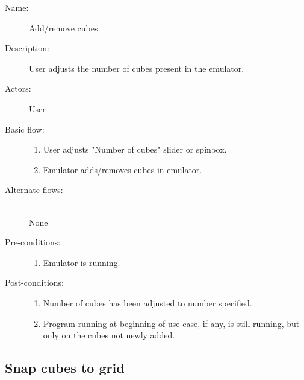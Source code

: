\documentclass[12pt]{article}
\begin{document}
    \begin{description}
      \item[Name:] Add/remove cubes
      \item[Description:] User adjusts the number of cubes present in the emulator.
      \item[Actors:] User
      \item[Basic flow:] \hfill
        \begin{enumerate}
	  \item{User adjusts "Number of cubes" slider or spinbox.}
	  \item{Emulator adds/removes cubes in emulator.}
        \end{enumerate}
      \item[Alternate flows:] \hfill \\
	None
      \item[Pre-conditions:] \hfill
        \begin{enumerate}
	  \item{Emulator is running.}
        \end{enumerate}
      \item[Post-conditions:] \hfill
        \begin{enumerate}
	  \item{Number of cubes has been adjusted to number specified.}
	  \item{Program running at beginning of use case, if any, is still running, but only on the cubes not newly added.}
        \end{enumerate}
    \end{description}

  \subsection{Snap cubes to grid}
\end{document}

